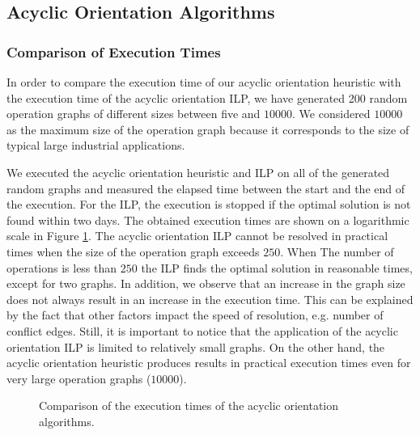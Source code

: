 \subsection{Acyclic Orientation Algorithms}

\subsubsection{Comparison of Execution Times}

In order to compare the execution time of our acyclic orientation heuristic with the execution time of the acyclic orientation ILP, we have generated 200 random operation graphs of different sizes between five and $10000$. %
We considered $10000$ as the maximum size of the operation graph because it corresponds to the size of typical large industrial applications. 

We executed the acyclic orientation heuristic and ILP on all of the generated random graphs and measured the elapsed time between the start and the end of the execution. For the ILP, the execution is stopped if the optimal solution is not found within two days. The obtained execution times are shown on a logarithmic scale in Figure \ref{fig:orient_exec}. The acyclic orientation ILP cannot be resolved in practical times when the size of the operation graph exceeds $250$. When The number of operations is less than $250$ the ILP finds the optimal solution in reasonable times, except for two graphs. In addition, we observe that an increase in the graph size does not always result in an increase in the execution time. This can be explained by the fact that other factors impact the speed of resolution, e.g. number of conflict edges. Still, it is important to notice that the application of the acyclic orientation ILP is limited to relatively small graphs. On the other hand, the acyclic orientation heuristic produces results in practical execution times even for very large operation graphs ($10000$).

\begin{figure}[phbt]
\centering

\caption{Comparison of the execution times of the acyclic orientation algorithms.}
\label{fig:orient_exec}
\end{figure} 
 
